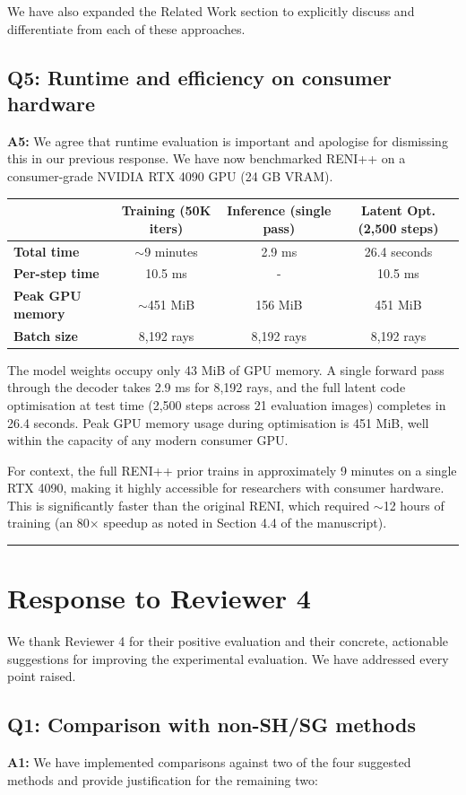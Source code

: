 \documentclass[11pt]{article}
\newcommand{\reviewer}[1]{\section*{\textcolor{reviewercolor}{Response to Reviewer #1}}}
\newcommand{\question}[1]{\subsection*{Q#1}}
\newcommand{\answer}[1]{\textbf{A#1:}}
\begin{document}
We have also expanded the Related Work section to explicitly discuss and differentiate from each of these approaches.

\question{5: Runtime and efficiency on consumer hardware}

\answer{5} We agree that runtime evaluation is important and apologise for dismissing this in our previous response. We have now benchmarked RENI++ on a consumer-grade NVIDIA RTX 4090 GPU (24 GB VRAM).

\begin{table}[h]
\centering
\begin{tabular}{lccc}
\toprule
 & Training (50K iters) & Inference (single pass) & Latent Opt. (2,500 steps) \\
\midrule
\textbf{Total time} & $\sim$9 minutes & 2.9 ms & 26.4 seconds \\
\textbf{Per-step time} & 10.5 ms & - & 10.5 ms \\
\textbf{Peak GPU memory} & $\sim$451 MiB & 156 MiB & 451 MiB \\
\textbf{Batch size} & 8,192 rays & 8,192 rays & 8,192 rays \\
\bottomrule
\end{tabular}
\end{table}

The model weights occupy only 43 MiB of GPU memory. A single forward pass through the decoder takes 2.9 ms for 8,192 rays, and the full latent code optimisation at test time (2,500 steps across 21 evaluation images) completes in 26.4 seconds. Peak GPU memory usage during optimisation is 451 MiB, well within the capacity of any modern consumer GPU.

For context, the full RENI++ prior trains in approximately 9 minutes on a single RTX 4090, making it highly accessible for researchers with consumer hardware. This is significantly faster than the original RENI, which required $\sim$12 hours of training (an 80$\times$ speedup as noted in Section 4.4 of the manuscript).

\vspace{1em}
\hrule
\vspace{1em}

\reviewer{4}

We thank Reviewer 4 for their positive evaluation and their concrete, actionable suggestions for improving the experimental evaluation. We have addressed every point raised.

\question{1: Comparison with non-SH/SG methods}

\answer{1} We have implemented comparisons against two of the four suggested methods and provide justification for the remaining two:
\end{document}
